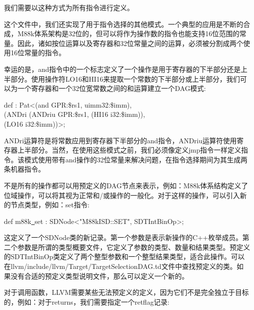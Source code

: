 我们需要以这种方式为所有指令进行定义。\par

这个文件中，我们还实现了用于指令选择的其他模式。一个典型的应用是不断的合成，M88k体系架构是32位的，但可以将作为操作数的指令也能支持16位范围的常量。因此，诸如按位运算以及寄存器和32位常量之间的运算，必须被分割成两个使用16位常量的指令。\par

幸运的是，and指令中的一个标志定义了一个操作是用于寄存器的下半部分还是上半部分。使用操作符LO16和HI16来提取一个常数的下半部分或上半部分，我们可以为一个寄存器和一个32位宽常数之间的和运算建立一个DAG模式:\par

\begin{tcolorbox}[colback=white,colframe=black]
def : Pat<(and GPR:\$rs1, uimm32:\$imm), \\
\hspace*{2cm}(ANDri (ANDriu GPR:\$rs1, (HI16 i32:\$imm)), \\
\hspace*{6cm}(LO16 i32:\$imm))>;
\end{tcolorbox}

ANDri运算符是将常数应用到寄存器下半部分的and指令，ANDriu运算符使用寄存器上半部分。当然，在使用这些模式之前，我们必须像定义jmp指令一样定义指令。该模式使用带有and操作的32位常量来解决问题，在指令选择期间为其生成两条机器指令。\par

不是所有的操作都可以用预定义的DAG节点来表示，例如：M88k体系结构定义了位域操作，可以将其视为正常和/或操作的一般化。对于这样的操作，可以引入新的节点类型，例如：set指令:\par

\begin{tcolorbox}[colback=white,colframe=black]
def m88k\underline{~}set : SDNode<"M88kISD::SET", SDTIntBinOp>;
\end{tcolorbox}

这定义了一个SDNode类的新记录。第一个参数是表示新操作的C++枚举成员。第二个参数是所谓的类型概要文件，它定义了参数的类型、数量和结果类型。预定义的SDTIntBinOp类定义了两个整型参数和一个整型结果类型，适合此操作。可以在llvm/include/llvm/Target/TargetSelectionDAG.td文件中查找预定义的类。如果没有合适的预定义类型说明文件，那么可以定义一个新的。\par

对于调用函数，LLVM需要某些无法预定义的定义，因为它们不是完全独立于目标的，例如：对于returns，我们需要指定一个retflag记录:\par

